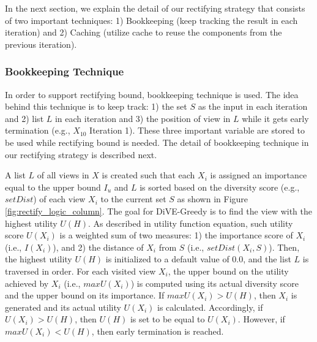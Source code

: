 \documentclass{article}
\begin{document}
In the next section, we explain the detail of our rectifying strategy that consists of two important techniques: 1) Bookkeeping (keep tracking the result in each iteration) and 2) Caching (utilize cache to reuse the components from the previous iteration).

\subsubsection{Bookkeeping Technique}
In order to support rectifying bound, bookkeeping technique is used. The idea behind this technique is to keep track: 1) the set $S$ as the input in each iteration and 2) list $L$ in each iteration and 3) the position of view in $L$ while it gets early termination (e.g., $X_{10}$ Iteration 1). These three important variable are stored to be used while rectifying bound is needed. The detail of bookkeeping technique in our rectifying strategy is described next.


A list $L$ of all views in $X$ is created such that each $X_i$ is assigned an importance equal to the upper bound $I_u$ and $L$ is sorted based on the diversity score (e.g., $setDist$) of each view $X_i$ to the current set $S$ as shown in Figure \ref{fig:rectify_logic_column}.
The goal for DiVE-Greedy is to find the view with the highest utility $U(H)$. As described in %
utility function equation, such utility score $U(X_i)$ is a weighted sum of two measures: 1) the importance score of $X_i$ (i.e., $I(X_i)$), and 2) the distance of $X_i$ from $S$ (i.e., $ setDist\left(X_i, S\right)$). Then, the highest utility $U(H)$ is initialized to a default value of 0.0, and the list $L$ is traversed in order. 
%
For each visited view $X_i$, the upper bound on the utility achieved by $X_i$ (i.e., $maxU(X_i)$) is computed using its actual diversity score and the upper bound on its importance.
%
If $maxU(X_i) > U(H)$, then $X_i$ is generated and its actual utility $U(X_i)$ is calculated. 
%
Accordingly, if $U(X_i) > U(H)$, then $U(H)$ is set to be equal to $U(X_i)$. 
%
However, if $maxU(X_i) < U(H)$, then early termination is reached. 
\end{document}
